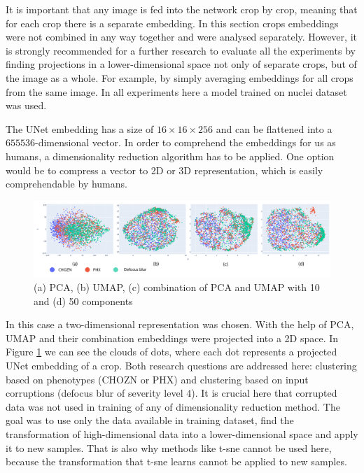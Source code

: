 It is important that any image is fed into the network crop by crop, meaning that for each crop there is a separate embedding. In this section crops embeddings were not combined in any way together and were analysed separately. However, it is strongly recommended for a further research to evaluate all the experiments by finding projections in a lower-dimensional space not only of separate crops, but of the image as a whole. For example, by simply averaging embeddings for all crops from the same image. In all experiments here a model trained on nuclei dataset was used.

The UNet embedding has a size of $16 \times 16 \times 256$ and can be flattened into a $655536$-dimensional vector. In order to comprehend the embeddings for us as humans, a dimensionality reduction algorithm has to be applied. One option would be to compress a vector to 2D or 3D representation, which is easily comprehendable by humans.
\begin{figure}[htb]
	\includegraphics[width=\linewidth]{bilder/unet-embeddings/umap-pca-embeddings.png}
	\caption{(a) PCA, (b) UMAP, (c) combination of PCA and UMAP with 10 and (d) 50 components}\label{fig:umap-pca-embeddings}
\end{figure}

In this case a two-dimensional representation was chosen. With the help of PCA, UMAP and their combination embeddings were projected into a 2D space. In Figure \ref{fig:umap-pca-embeddings} we can see the clouds of dots, where each dot represents a projected UNet embedding of a crop. Both research questions are addressed here: clustering based on phenotypes (CHOZN or PHX) and clustering based on input corruptions (defocus blur of severity level $4$). It is crucial here that corrupted data was not used in training of any of dimensionality reduction method. The goal was to use only the data available in training dataset, find the transformation of high-dimensional data into a lower-dimensional space and apply it to new samples. That is also why methods like t-sne \cite{t-sne} cannot be used here, because the transformation that t-sne learns cannot be applied to new samples. 

